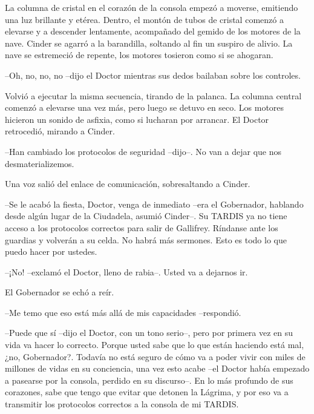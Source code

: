 La columna de cristal en el corazón de la consola empezó a moverse, emitiendo una luz brillante y etérea. Dentro, el montón de tubos de cristal comenzó a elevarse y a descender lentamente, acompañado del gemido de los motores de la nave. Cinder se agarró a la barandilla, soltando al fin un suspiro de alivio. La nave se estremeció de repente, los motores tosieron como si se ahogaran.



--Oh, no, no, no --dijo el Doctor mientras sus dedos bailaban sobre los controles.



Volvió a ejecutar la misma secuencia, tirando de la palanca. La columna central comenzó a elevarse una vez más, pero luego se detuvo en seco. Los motores hicieron un sonido de asfixia, como si lucharan por arrancar. El Doctor retrocedió, mirando a Cinder.



--Han cambiado los protocolos de seguridad --dijo--. No van a dejar que nos desmaterializemos.



Una voz salió del enlace de comunicación, sobresaltando a Cinder.



--Se le acabó la fiesta, Doctor, venga de inmediato --era el Gobernador, hablando desde algún lugar de la Ciudadela, asumió Cinder--. Su TARDIS ya no tiene acceso a los protocolos correctos para salir de Gallifrey. Ríndanse ante los guardias y volverán a su celda. No habrá más sermones. Esto es todo lo que puedo hacer por ustedes.



--¡No! --exclamó el Doctor, lleno de rabia--. Usted va a dejarnos ir.



El Gobernador se echó a reír.



--Me temo que eso está más allá de mis capacidades --respondió.



--Puede que sí --dijo el Doctor, con un tono serio--, pero por primera vez en su vida va hacer lo correcto. Porque usted sabe que lo que están haciendo está mal, ¿no, Gobernador?. Todavía no está seguro de cómo va a poder vivir con miles de millones de vidas en su conciencia, una vez esto acabe --el Doctor había empezado a pasearse por la consola, perdido en su discurso--. En lo más profundo de sus corazones, sabe que tengo que evitar que detonen la Lágrima, y por eso va a transmitir los protocolos correctos a la consola de mi TARDIS.



